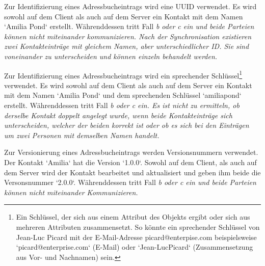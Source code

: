 %
%
\def \naturalkey {Ein Schlüssel, der sich aus einem Attribut des Objekts ergibt oder sich aus mehreren Attributen zusammensetzt. So könnte ein sprechender Schlüssel von Jean-Luc Picard mit der E-Mail-Adresse picard@enterpise.com beispielsweise `picard@enterprise.com` (E-Mail) oder `Jean-LucPicard` (Zusammensetzung aus Vor- und Nachnamen) sein.}
\def \logicalclock {Eine Logische Uhr ist eine Komponente die dazu dient, dem Datenobjekt einen eindeutigen Zeitstempel zuzuweisen. Die bekanntesten Verfahren für Logische Uhren in verteilten Systemen sind die Lamport-Uhr und die Vektoruhr. Beide verwenden Zähler die sich bei jedem Ereignis erhöhen. Einfach gesagt besteht die Lamport-Uhr aus einem Zeitstempel und einem Zähler, die Vektoruhr aus einem Zeitstempel und einem Vektor -- einer Liste aus Zählern.}
%
%
\begin{description}[leftmargin=0.5cm,style=nextline]
  \item[Methode ID0 -- UUID:]
    Zur Identifizierung eines Adressbucheintrags wird eine \gls{UUID} verwendet. Es wird sowohl auf dem Client als auch auf dem Server ein Kontakt mit dem Namen `Amilia Pond` erstellt.
    Währenddessen tritt Fall \it{b} oder \it{c} ein und beide Parteien können nicht miteinander kommunizieren. Nach der Synchronisation existieren zwei Kontakteinträge mit gleichem Namen, aber unterschiedlicher ID.
    Sie sind voneinander zu unterscheiden und können einzeln behandelt werden.\\
  \item[Methode ID1 -- sprechender Schlüssel:]
    Zur Identifizierung eines Adressbucheintrags wird ein sprechender Schlüssel\footnote{\naturalkey} verwendet.
    Es wird sowohl auf dem Client als auch auf dem Server ein Kontakt mit dem Namen `Amilia Pond` und dem sprechenden Schlüssel `amiliapond` erstellt. Währenddessen tritt Fall \it{b} oder \it{c} ein.
    Es ist nicht zu ermitteln, ob derselbe Kontakt doppelt angelegt wurde, wenn beide Kontakteinträge sich unterscheiden, welcher der beiden korrekt ist oder ob es sich bei den Einträgen um zwei Personen mit demselben Namen handelt.\\
  \item[Methode V0 -- Versionsnummer:]
    Zur Versionierung eines Adressbucheintrags werden Versionsnummern verwendet. Der Kontakt `Amilia` hat die Version `1.0.0`.
    Sowohl auf dem Client, als auch auf dem Server wird der Kontakt bearbeitet und aktualisiert und geben ihm beide die Versonsnummer `2.0.0`.
    Währenddessen tritt Fall \it{b} oder \it{c} ein und beide Parteien können nicht miteinander Kommunizieren.

\end{description}
